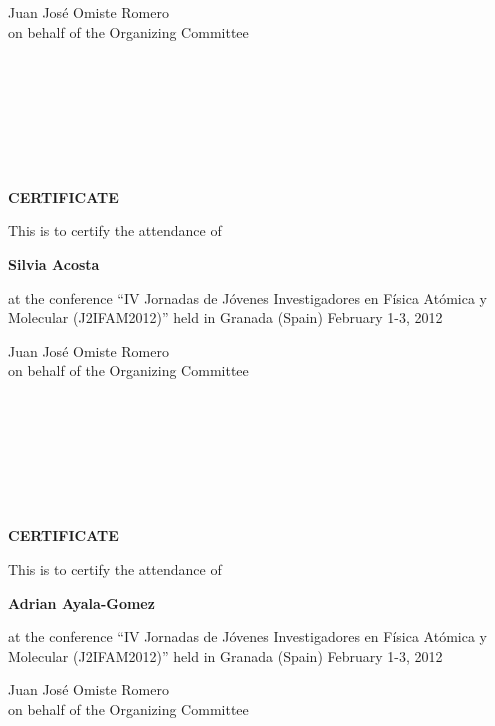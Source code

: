 \documentclass [13pt,a4paper] {letter}
\begin{document}
\vspace {4cm}
\begin{raggedleft}
Juan José Omiste Romero\\
on behalf of the Organizing Committee
\newpage
\end{raggedleft}
\begin{verbatim}







\end{verbatim}
\pagestyle{empty}
\begin{center}
{\bf {\Huge CERTIFICATE}}

\vspace {1.5cm}
This is to certify the attendance of
\vspace {1cm}

{\bf \Large  Silvia    Acosta }
\vspace {1cm}

at the conference { \textquotedblleft IV Jornadas de Jóvenes Investigadores en Física Atómica y Molecular (J2IFAM2012)\textquotedblright} 
held in Granada (Spain) February 1-3, 2012
\end{center}
\vspace {4cm}
\begin{raggedleft}
Juan José Omiste Romero\\
on behalf of the Organizing Committee
\newpage
\end{raggedleft}
\begin{verbatim}







\end{verbatim}
\pagestyle{empty}
\begin{center}
{\bf {\Huge CERTIFICATE}}

\vspace {1.5cm}
This is to certify the attendance of
\vspace {1cm}

{\bf \Large  Adrian    Ayala-Gomez }
\vspace {1cm}

at the conference { \textquotedblleft IV Jornadas de Jóvenes Investigadores en Física Atómica y Molecular (J2IFAM2012)\textquotedblright} 
held in Granada (Spain) February 1-3, 2012
\end{center}
\vspace {4cm}
\begin{raggedleft}
Juan José Omiste Romero\\
on behalf of the Organizing Committee
\newpage
\end{raggedleft}
\begin{verbatim}







\end{verbatim}
\end{document}

